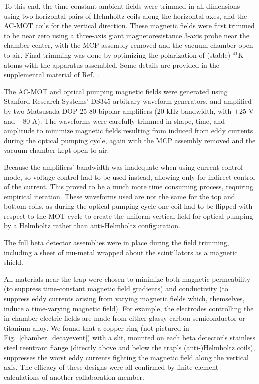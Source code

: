 To this end, the time-constant ambient fields were trimmed in all dimensions using two horizontal pairs of Helmholtz coils along the horizontal axes, and the AC-MOT coils for the vertical direction.
These magnetic fields were first trimmed to be near zero using a three-axis giant magnetoresistance 3-axis probe near the chamber center, with the \ac{MCP} assembly removed and the vacuum chamber open to air.
%
Final trimming was done by optimizing the polarization of (stable) $^{41}$K atoms with the apparatus assembled.  Some details are provided in the supplemental material of Ref.~\cite{ben_Abeta}. 


The AC-MOT and optical pumping magnetic fields were generated using Stanford Research Systems' DS345 arbitrary waveform generators, and amplified by two \mbox{Matsusada} DOP 25-80 bipolar amplifiers (20 kHz bandwidth, with $\pm$25 V and $\pm$80 A).
The waveforms were carefully trimmed in shape, time, and amplitude to minimize magnetic fields resulting from induced from eddy currents during the optical pumping cycle, again with the MCP assembly removed and the vacuum chamber kept open to air.

Because the amplifiers' bandwidth was inadequate when using current control mode, so voltage control had to be used instead, allowing only for indirect control of the current.  This proved to be a much more time consuming process, requiring empirical iteration.  
These waveforms used are not the same for the top and bottom coils, as during the optical pumping cycle one coil had to be flipped with respect to the MOT cycle to create the uniform vertical field for optical pumping by a Helmholtz rather than anti-Helmholtz configuration.


The full beta detector assemblies were in place during the field trimming, including a sheet of mu-metal wrapped about the scintillators as a magnetic shield.  


All materials near the trap were chosen to minimize both magnetic permeability (to suppress time-constant magnetic field gradients) and conductivity (to suppress eddy currents arising from varying magnetic fields which, themselves, induce a time-varying magnetic field).  For example, the electrodes controlling the in-chamber electric fields are made from either glassy carbon semiconductor or titanium alloy.  We found that a 
copper ring (not pictured in Fig.~\ref{chamber_decayevent}) with a slit, mounted on each beta detector's stainless steel reentrant flange (directly above and below the trap's (anti-)Helmholtz coils), suppresses the worst eddy currents fighting the magnetic field along the vertical axis. The efficacy of these designs were all confirmed by finite element calculations of another collaboration member.



